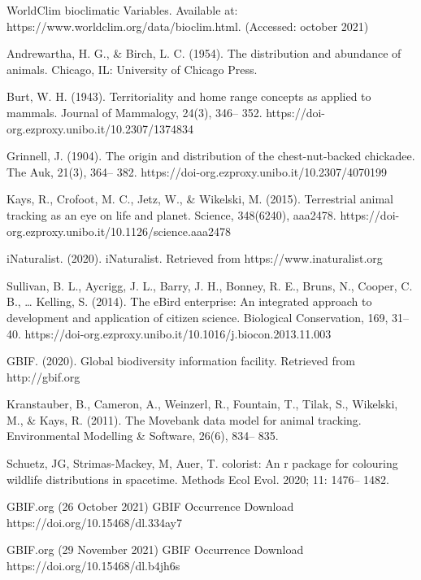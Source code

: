 \documentclass[12pt,a4paper]{article}
\begin{document}
\begin{thebibliography}{999}
WorldClim bioclimatic Variables. Available at: https://www.worldclim.org/data/bioclim.html. (Accessed: october 2021)

Andrewartha, H. G., \& Birch, L. C. (1954). The distribution and abundance of animals. Chicago, IL: University of Chicago Press.

Burt, W. H. (1943). Territoriality and home range concepts as applied to mammals. Journal of Mammalogy, 24(3), 346– 352. https://doi-org.ezproxy.unibo.it/10.2307/1374834

Grinnell, J. (1904). The origin and distribution of the chest-nut-backed chickadee. The Auk, 21(3), 364– 382. https://doi-org.ezproxy.unibo.it/10.2307/4070199

Kays, R., Crofoot, M. C., Jetz, W., \& Wikelski, M. (2015). Terrestrial animal tracking as an eye on life and planet. Science, 348(6240), aaa2478. https://doi-org.ezproxy.unibo.it/10.1126/science.aaa2478

iNaturalist. (2020). iNaturalist. Retrieved from https://www.inaturalist.org

Sullivan, B. L., Aycrigg, J. L., Barry, J. H., Bonney, R. E., Bruns, N., Cooper, C. B., … Kelling, S. (2014). The eBird enterprise: An integrated approach to development and application of citizen science. Biological Conservation, 169, 31– 40. https://doi-org.ezproxy.unibo.it/10.1016/j.biocon.2013.11.003

GBIF. (2020). Global biodiversity information facility. Retrieved from http://gbif.org

Kranstauber, B., Cameron, A., Weinzerl, R., Fountain, T., Tilak, S., Wikelski, M., \& Kays, R. (2011). The Movebank data model for animal tracking. Environmental Modelling & Software, 26(6), 834– 835.

Schuetz, JG, Strimas-Mackey, M, Auer, T. colorist: An r package for colouring wildlife distributions in spacetime. Methods Ecol Evol. 2020; 11: 1476– 1482. 

GBIF.org (26 October 2021) GBIF Occurrence Download  https://doi.org/10.15468/dl.334ay7

GBIF.org (29 November 2021) GBIF Occurrence Download  https://doi.org/10.15468/dl.b4jh6s


\end{thebibliography}
\end{document}
